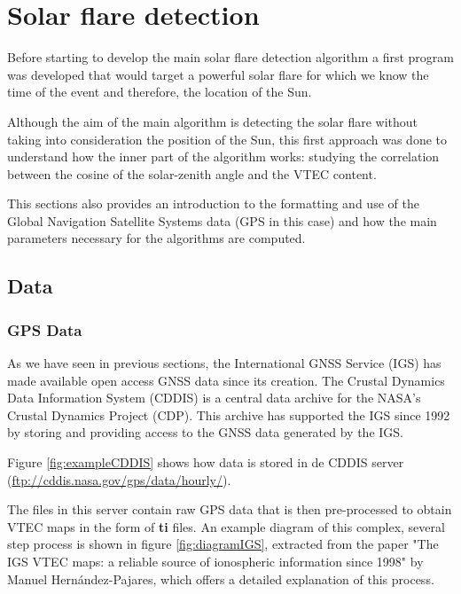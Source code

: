 \chapter{Solar flare detection}

Before starting to develop the main solar flare detection algorithm a first program was developed that would target a powerful solar flare for which we know the time of the event and therefore, the location of the Sun.

Although the aim of the main algorithm is detecting the solar flare without taking into consideration the position of the Sun, this first approach was done to understand how the inner part of the algorithm works: studying the correlation between the cosine of the solar-zenith angle and the VTEC content.

This sections also provides an introduction to the formatting and use of the Global Navigation Satellite Systems data (GPS in this case) and how the main parameters necessary for the algorithms are computed.

\section{Data}

\subsection{GPS Data}

As we have seen in previous sections, the International GNSS Service (IGS) has made available open access GNSS data since its creation. The Crustal Dynamics Data Information System (CDDIS) is a central data archive for the NASA's Crustal Dynamics Project (CDP). This archive has supported the IGS since 1992 by storing and providing access to the GNSS data generated by the IGS.

Figure \ref{fig:exampleCDDIS} shows how data is stored in de CDDIS server (\url{ftp://cddis.nasa.gov/gps/data/hourly/}).

The files in this server contain raw GPS data that is then pre-processed to obtain VTEC maps in the form of \textbf{ti} files. An example diagram of this complex, several step process is shown in figure \ref{fig:diagramIGS}, extracted from the paper "The IGS VTEC maps: a reliable source of ionospheric information since 1998" \cite{hernandez2009igs} by Manuel Hernández-Pajares, which offers a detailed explanation of this process. 

